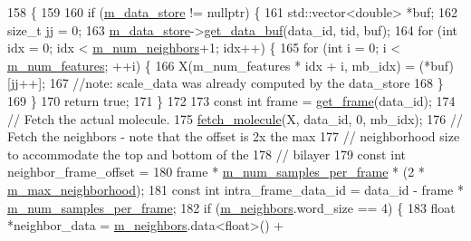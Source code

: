 \begin{DoxyCode}
158                                             \{
159 
160   \textcolor{keywordflow}{if} (\hyperlink{classlbann_1_1generic__data__reader_aefc076b842933a882214f4f709ca49c9}{m\_data\_store} != \textcolor{keyword}{nullptr}) \{
161     std::vector<double> *buf;
162     \textcolor{keywordtype}{size\_t} jj = 0;
163     \hyperlink{classlbann_1_1generic__data__reader_aefc076b842933a882214f4f709ca49c9}{m\_data\_store}->\hyperlink{classlbann_1_1generic__data__store_a2abb3d0327b528d36e23fcef9b937798}{get\_data\_buf}(data\_id, tid, buf);
164     \textcolor{keywordflow}{for} (\textcolor{keywordtype}{int} idx = 0; idx < \hyperlink{classlbann_1_1pilot2__molecular__reader_aaf41323e4da85467de398b4ab4b58c2c}{m\_num\_neighbors}+1; idx++) \{
165       \textcolor{keywordflow}{for} (\textcolor{keywordtype}{int} i = 0; i < \hyperlink{classlbann_1_1pilot2__molecular__reader_a7fd7dac6f280fd8ef92bd5d2ffc89e36}{m\_num\_features}; ++i) \{
166         X(m\_num\_features * idx + i, mb\_idx) = (*buf)[jj++];
167         \textcolor{comment}{//note: scale\_data was already computed by the data\_store}
168       \}
169     \}
170     \textcolor{keywordflow}{return} \textcolor{keyword}{true};
171   \}
172 
173   \textcolor{keyword}{const} \textcolor{keywordtype}{int} frame = \hyperlink{classlbann_1_1pilot2__molecular__reader_ac95223a0829a83a5d400c4d66efdcb93}{get\_frame}(data\_id);
174   \textcolor{comment}{// Fetch the actual molecule.}
175   \hyperlink{classlbann_1_1pilot2__molecular__reader_ae45c583f72e11aeb5d955e2657a9a3e8}{fetch\_molecule}(X, data\_id, 0, mb\_idx);
176   \textcolor{comment}{// Fetch the neighbors - note that the offset is 2x the max}
177   \textcolor{comment}{// neighborhood size to accommodate the top and bottom of the}
178   \textcolor{comment}{// bilayer}
179   \textcolor{keyword}{const} \textcolor{keywordtype}{int} neighbor\_frame\_offset =
180     frame * \hyperlink{classlbann_1_1pilot2__molecular__reader_a1aa5896276d8a0576f7b3c2b955130be}{m\_num\_samples\_per\_frame} * (2 * 
      \hyperlink{classlbann_1_1pilot2__molecular__reader_a0c9e71035cf47191002d1b164d056f50}{m\_max\_neighborhood});
181   \textcolor{keyword}{const} \textcolor{keywordtype}{int} intra\_frame\_data\_id = data\_id - frame * \hyperlink{classlbann_1_1pilot2__molecular__reader_a1aa5896276d8a0576f7b3c2b955130be}{m\_num\_samples\_per\_frame};
182   \textcolor{keywordflow}{if} (\hyperlink{classlbann_1_1pilot2__molecular__reader_a0d8dc24b8ea66352a4d45a157b3a3c04}{m\_neighbors}.word\_size == 4) \{
183     \textcolor{keywordtype}{float} *neighbor\_data = \hyperlink{classlbann_1_1pilot2__molecular__reader_a0d8dc24b8ea66352a4d45a157b3a3c04}{m\_neighbors}.data<\textcolor{keywordtype}{float}>() +

\end{DoxyCode}
